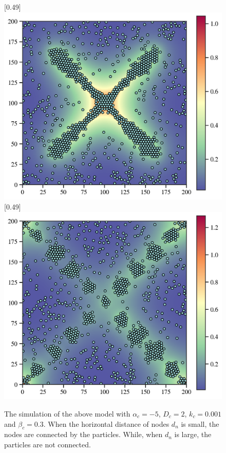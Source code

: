 \documentclass{article}
\begin{document}
\begin{figure}[htbp]
    \centering
    [0.49\linewidth]{
      \includegraphics[width=\linewidth]{figs/simpleModeling1.png}
    }
    \hfill
    [0.49\linewidth]{
      \includegraphics[width=\linewidth]{figs/simpleModeling2.png}
    }
    \caption{
        The simulation of the above model with $\alpha_c=-5$, $D_c=2$, $k_c=0.001$ and $\beta_c=0.3$. When the horizontal distance of nodes $d_n$ is small, the nodes are connected by the particles. While, when $d_n$ is large, the particles are not connected. 
    }
\end{figure}
\end{document}
